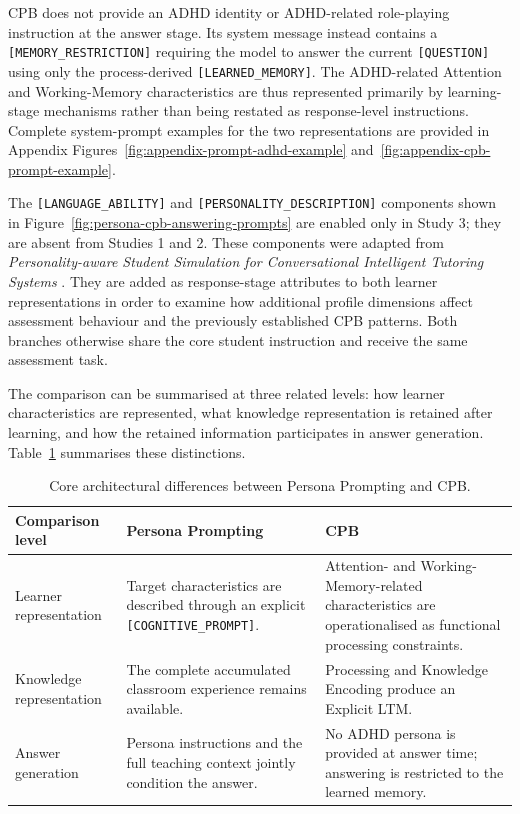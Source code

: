CPB does not provide an ADHD identity or ADHD-related role-playing instruction at the answer stage. Its system message instead contains a \texttt{[MEMORY\_RESTRICTION]} requiring the model to answer the current \texttt{[QUESTION]} using only the process-derived \texttt{[LEARNED\_MEMORY]}. The ADHD-related Attention and Working-Memory characteristics are thus represented primarily by learning-stage mechanisms rather than being restated as response-level instructions. Complete system-prompt examples for the two representations are provided in Appendix Figures~\ref{fig:appendix-prompt-adhd-example} and~\ref{fig:appendix-cpb-prompt-example}.

The \texttt{[LANGUAGE\_ABILITY]} and \texttt{[PERSONALITY\_DESCRIPTION]} components shown in Figure~\ref{fig:persona-cpb-answering-prompts} are enabled only in Study 3; they are absent from Studies 1 and 2. These components were adapted from \textit{Personality-aware Student Simulation for Conversational Intelligent Tutoring Systems} \cite{liu-etal-2024-personality}. They are added as response-stage attributes to both learner representations in order to examine how additional profile dimensions affect assessment behaviour and the previously established CPB patterns. Both branches otherwise share the core student instruction and receive the same assessment task.

The comparison can be summarised at three related levels: how learner characteristics are represented, what knowledge representation is retained after learning, and how the retained information participates in answer generation. Table~\ref{tab:persona-cpb-architectural-comparison} summarises these distinctions.

\begin{table}[H]
\centering
\caption{Core architectural differences between Persona Prompting and CPB.}
\label{tab:persona-cpb-architectural-comparison}
\scriptsize
\setlength{\tabcolsep}{3pt}
\renewcommand{\arraystretch}{1.2}
\begin{tabular*}{\textwidth}{@{\extracolsep{\fill}}>{\raggedright\arraybackslash}p{}>{\raggedright\arraybackslash}p{}>{\raggedright\arraybackslash}p{}@{}}
\toprule
\textbf{Comparison level} & \textbf{Persona Prompting} & \textbf{CPB} \\
\midrule
Learner representation & Target characteristics are described through an explicit \texttt{[COGNITIVE\_PROMPT]}. & Attention- and Working-Memory-related characteristics are operationalised as functional processing constraints. \\
Knowledge representation & The complete accumulated classroom experience remains available. & Processing and Knowledge Encoding produce an Explicit LTM. \\
Answer generation & Persona instructions and the full teaching context jointly condition the answer. & No ADHD persona is provided at answer time; answering is restricted to the learned memory. \\
\bottomrule
\end{tabular*}
\end{table}

